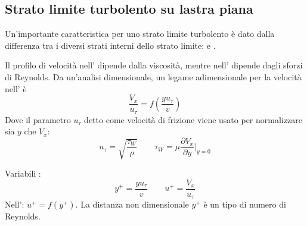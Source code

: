 \subsection{Strato limite turbolento su lastra piana}
Un'importante caratteristica per uno strato limite turbolento è dato dalla differenza tra i diversi strati interni dello strato limite:  e .

Il profilo di velocità nell' dipende dalla viscosità, mentre nell' dipende dagli sforzi di Reynolds.
Da un'analisi dimensionale, un legame adimensionale per la velocità nell' è
\begin{equation}
\frac{V_x}{u_{\tau}}= f(\frac{y u_{\tau}}{v})
\end{equation}
Dove il parametro $u_{\tau}$ detto come velocità di frizione viene usato per normalizzare sia $y$ che $V_x$:
\begin{equation}
u_{\tau} = \sqrt{\frac{\tau_W}{\rho}} \qquad \tau_W = \mu\frac{\partial V_x}{\partial y}\Big|_{y=0}
\end{equation}

Variabili :
\begin{equation}
y^+ = \frac{y u_{\tau}}{v} \qquad u^+ = \frac{V_x}{u_{\tau}}
\end{equation}
Nell': $u^+ = f(y^+)$.
La distanza non dimensionale $y^+$ è un tipo di numero di Reynolds.

